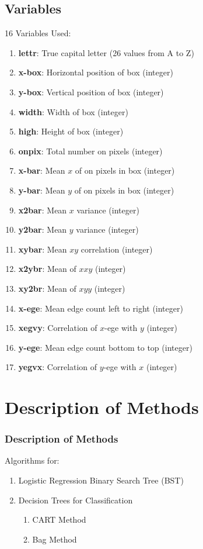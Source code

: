 \documentclass{beamer}
\begin{document}
\subsection{Variables}
\begin{frame}
16 Variables Used:

\begin{enumerate}
\item \small{\textbf{lettr}: True capital letter	(26 values from A to Z) }
\item \small{\textbf{x-box}:  Horizontal position of box	(integer) }
\item \small{\textbf{y-box}:	Vertical position of box	(integer) }
\item \small{\textbf{width}:	Width of box	 (integer) }
\item \small{\textbf{high}: Height of box	 (integer) }
\item \small{\textbf{onpix}:	Total number on pixels	 (integer) }
\item \small{\textbf{x-bar}:	Mean $x$ of on pixels in box	(integer) }
\item \small{\textbf{y-bar}:	Mean $y$ of on pixels in box	(integer) }
\item \small{\textbf{x2bar}:	Mean $x$ variance	 (integer) }
\item \small{\textbf{y2bar}:	Mean $y$ variance	 (integer) }
\item \small{\textbf{xybar}:	Mean $xy$ correlation	 (integer) }
\item \small{\textbf{x2ybr}:	Mean of $xxy$	 (integer) }
\item \small{\textbf{xy2br}:	Mean of $xyy$	 (integer) }
\item \small{\textbf{x-ege}:	Mean edge count left to right	(integer) }
\item \small{\textbf{xegvy}:	Correlation of $x$-ege with $y$	(integer) }
\item \small{\textbf{y-ege}:	Mean edge count bottom to top	(integer) }
\item \small{\textbf{yegvx}:	Correlation of $y$-ege with $x$	(integer)}
\end{enumerate}
\end{frame}

\section{Description of Methods}
\begin{frame}
\frametitle{Description of Methods}

Algorithms for:
\begin{enumerate}
\item Logistic Regression Binary Search Tree (BST)
\item Decision Trees for Classification
\begin{enumerate}
\item CART Method
\item Bag Method 
\end{enumerate}
\end{enumerate}
\end{frame}
\end{document}

